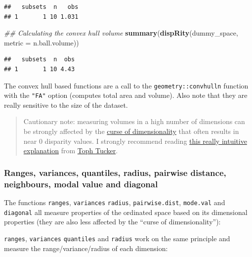 \documentclass[]{book}
\newenvironment{Shaded}{\begin{snugshade}}{\end{snugshade}}
\newcommand{\CommentTok}[1]{\textcolor[rgb]{0.56,0.35,0.01}{\textit{#1}}}
\newcommand{\DataTypeTok}[1]{\textcolor[rgb]{0.13,0.29,0.53}{#1}}
\newcommand{\KeywordTok}[1]{\textcolor[rgb]{0.13,0.29,0.53}{\textbf{#1}}}
\newcommand{\NormalTok}[1]{#1}
\begin{document}
\begin{verbatim}
##   subsets  n   obs
## 1       1 10 1.031
\end{verbatim}

\begin{Shaded}
\begin{Highlighting}[]
\CommentTok{## Calculating the convex hull volume}
\KeywordTok{summary}\NormalTok{(}\KeywordTok{dispRity}\NormalTok{(dummy_space, }\DataTypeTok{metric =}\NormalTok{ n.ball.volume))}
\end{Highlighting}
\end{Shaded}

\begin{verbatim}
##   subsets  n  obs
## 1       1 10 4.43
\end{verbatim}

The convex hull based functions are a call to the \texttt{geometry::convhulln} function with the \texttt{"FA"} option (computes total area and volume).
Also note that they are really sensitive to the size of the dataset.

\begin{quote}
Cautionary note: measuring volumes in a high number of dimensions can be strongly affected by the \href{https://en.wikipedia.org/wiki/Curse_of_dimensionality}{curse of dimensionality} that often results in near 0 disparity values. I strongly recommend reading \href{https://beta.observablehq.com/@tophtucker/theres-plenty-of-room-in-the-corners}{this really intuitive explanation} from \href{https://github.com/tophtucker}{Toph Tucker}.
\end{quote}

\hypertarget{ranges-variances-quantiles-radius-pairwise-distance-neighbours-modal-value-and-diagonal}{%
\subsubsection{Ranges, variances, quantiles, radius, pairwise distance, neighbours, modal value and diagonal}\label{ranges-variances-quantiles-radius-pairwise-distance-neighbours-modal-value-and-diagonal}}

The functions \texttt{ranges}, \texttt{variances} \texttt{radius}, \texttt{pairwise.dist}, \texttt{mode.val} and \texttt{diagonal} all measure properties of the ordinated space based on its dimensional properties (they are also less affected by the ``curse of dimensionality''):

\texttt{ranges}, \texttt{variances} \texttt{quantiles} and \texttt{radius} work on the same principle and measure the range/variance/radius of each dimension:
\end{document}

